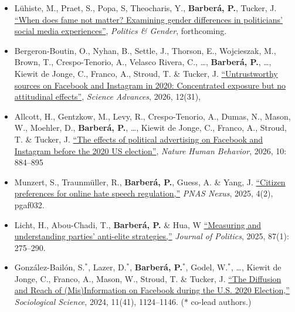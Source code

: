\documentclass[margin,line,11pt]{resume}
\begin{document}
\begin{resume}
\begin{itemize}[leftmargin=5.5mm]
\item[38.] Lühiste, M., Praet, S., Popa, S, Theocharis, Y., \textbf{Barber\'{a}, P.}, Tucker, J. \href{https://www.cambridge.org/core/journals/politics-and-gender/article/when-does-fame-not-matter-examining-gender-differences-in-politicians-social-media-experiences/78BB8D1D35DD19124167E06BF47951F3}{``When does fame not matter? Examining gender differences in politicians' social media experiences''}, \textit{Politics \& Gender}, forthcoming.

\item[37.] Bergeron-Boutin, O., Nyhan, B., Settle, J., Thorson, E., Wojcieszak, M., Brown, T., Crespo-Tenorio, A., Velasco Rivera, C., \ldots, \textbf{Barber\'{a}, P.}, \ldots, Kiewit de Jonge, C., Franco, A., Stroud, T. \& Tucker, J. \href{https://www.science.org/doi/10.1126/sciadv.adz6502}{``Untrustworthy sources on Facebook and Instagram in 2020: Concentrated exposure but no attitudinal effects''}, \textit{Science Advances}, 2026, 12(31), 

\item[36.] Allcott, H., Gentzkow, M., Levy, R., Crespo-Tenorio, A., Dumas, N., Mason, W., Moehler, D., \textbf{Barber\'{a}, P.}, \ldots, Kiewit de Jonge, C., Franco, A., Stroud, T. \& Tucker, J. \href{https://www.nature.com/articles/s41562-025-02328-w}{``The effects of political advertising on Facebook and Instagram before the 2020 US election''}, \textit{Nature Human Behavior}, 2026, 10: 884–895

\item[35.] Munzert, S., Traunmüller, R., \textbf{Barber\'{a}, P.}, Guess, A. \& Yang, J. \href{https://academic.oup.com/pnasnexus/advance-article/doi/10.1093/pnasnexus/pgaf032/8010228}{``Citizen preferences for online hate speech regulation,''} \textit{PNAS Nexus}, 2025, 4(2), pgaf032.

\item[34.] Licht, H., Abou-Chadi, T., \textbf{Barber\'{a}, P.} \& Hua, W \href{https://www.journals.uchicago.edu/doi/abs/10.1086/730711}{``Measuring and understanding parties’ anti-elite strategies,''}  \textit{Journal of Politics}, 2025, 87(1): 275--290.

\newpage 

\item[33.] Gonz\'{a}lez-Bail\'{o}n, S.$^\ast$, Lazer, D.$^\ast$,  \textbf{Barber\'{a}, P.$^\ast$}, Godel, W.$^\ast$, \ldots, Kiewit de Jonge, C., Franco, A., Mason, W., Stroud, T. \& Tucker, J. \href{https://sociologicalscience.com/articles-v11-41-1124/}{``The Diffusion and Reach of (Mis)Information on Facebook during the U.S. 2020 Election,''} \textit{Sociological Science}, 2024, 11(41), 1124--1146. ($\ast$ co-lead authors.)


\end{itemize}
\end{resume}
\end{document}
